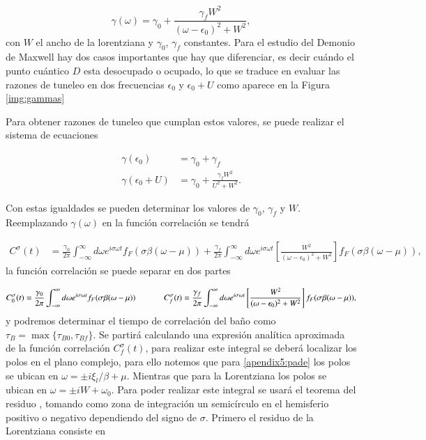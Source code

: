 \begin{appendixs}
\begin{equation*}
    \gamma(\omega) = \gamma_{0} + \frac{\gamma_{f} W^{2}}{(\omega - \epsilon_{0})^{2} + W^{2}},
\end{equation*}
con $W$ el ancho de la lorentziana y $\gamma_{0}$, $\gamma_{f}$ constantes. Para el estudio del Demonio de Maxwell hay dos casos importantes que hay que diferenciar, es decir cuándo el punto cuántico $D$ esta desocupado o ocupado, lo que se traduce en evaluar las razones de tuneleo en dos frecuencias $\epsilon_{0}$ y $\epsilon_{0}+U$ como aparece en la Figura \ref{img:gammas}


Para obtener razones de tuneleo que cumplan estos valores, se puede realizar el sistema de ecuaciones 

\begin{align*}
    \gamma(\epsilon_{0}) & = \gamma_{0} + \gamma_{f} \\
    \gamma(\epsilon_{0} + U) & = \gamma_{0} + \frac{\gamma_{f} W^{2} }{U^{2} + W^{2}}.
\end{align*}

Con estas igualdades se pueden determinar los valores de $\gamma_{0}$, $\gamma_{f}$ y $W$. Reemplazando $\gamma(\omega)$ en la función correlación se tendrá

\begin{align*}
    C^{\sigma}(t) & = \frac{\gamma_{0}}{2\pi} \int_{-\infty}^{\infty}d\omega e^{i\sigma \omega t} f_{F}(\sigma \beta (\omega-\mu)) + \frac{\gamma_{f}}{2\pi} \int_{-\infty}^{\infty}d\omega e^{i\sigma \omega t}\left[ \frac{W^{2}}{(\omega-\epsilon_{0})^{2} + W^{2}} \right] f_{F}(\sigma \beta (\omega-\mu)),
\end{align*}
la función correlación se puede separar en dos partes

\begin{equation*}
    C^{\sigma}_{0}(t) = \frac{\gamma_{0}}{2\pi} \int_{-\infty}^{\infty}d\omega e^{i\sigma \omega t} f_{F}(\sigma \beta (\omega-\mu)) \hspace{12mm} C^{\sigma}_{f}(t) = \frac{\gamma_{f}}{2\pi} \int_{-\infty}^{\infty}d\omega e^{i\sigma \omega t}\left[ \frac{W^{2}}{(\omega-\epsilon_{0})^{2} + W^{2}} \right] f_{F}(\sigma \beta (\omega-\mu)),
\end{equation*}
y podremos determinar el tiempo de correlación del baño como $\tau_{B} = \max\{\tau_{B0},\tau_{Bf}\}$. Se partirá calculando una expresión analítica aproximada de la función correlación $C^{\sigma}_{f}(t)$, para realizar este integral se deberá localizar los polos en el plano complejo, para ello notemos que para \ref{apendix5:pade} los polos se ubican en $\omega = \pm i \xi_{l}/\beta + \mu $. Mientras que para la Lorentziana los polos se ubican en $\omega = \pm i W + \omega_{0}$. Para poder realizar este integral se usará el teorema del residuo \cite{riley2006mathematical}, tomando como zona de integración un semicírculo en el hemisferio positivo o negativo dependiendo del signo de $\sigma$. Primero el residuo de la Lorentziana consiste en 


\end{appendixs}
